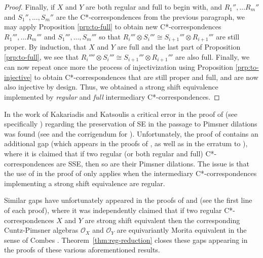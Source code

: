 \documentclass[11pt, letterpaper,final]{amsart}
\theoremstyle{definition}
\begin{document}
\begin{proof}
Finally, if $X$ and $Y$ are both regular and full to begin with, and $R_1'',...R_m''$ and $S_1'',...,S_m''$ are the C*-correspondences from the previous paragraph, we may apply Proposition \ref{prp:to-full} to obtain new C*-correspondences $R_1''',...R_m'''$ and $S_1''',...,S_m'''$ so that $R_i''' \otimes S_i''' \cong S_{i+1}''' \otimes R_{i+1}'''$ are still proper. By induction, that $X$ and $Y$ are full and the last part of Proposition \ref{prp:to-full}, we see that $R_i'''' \otimes S_i''' \cong S_{i+1}''' \otimes R_{i+1}'''$ are also full. Finally, we can now repeat once more the process of injectivization using Proposition \ref{prp:to-injective} to obtain C*-correspondences that are still proper and full, and are now also injective by design. Thus, we obtained a strong shift equivalence implemented by \emph{regular} and \emph{full} intermediary C*-correspondences.
\end{proof}

In the work of Kakariadis and Katsoulis \cite{KK-JFA2014} a critical error in the proof of \cite[Theorem 5.9]{KK-JFA2014} (see specifically \cite[Theorem 5.8]{KK-JFA2014}) regarding the preservation of SE in the passage to Pimsner dilations was found (see \cite{CDE} and the corrigendum for \cite{KK-JFA2014}). Unfortunately, the proof of \cite[Theorems 5.9]{KK-JFA2014} contains an additional gap (which appears in the proofs of \cite[Theorem 5.5 \& 7.1]{KK-JFA2014}, as well as in the erratum to \cite{KK-JFA2014}), where it is claimed that if two regular (or both regular and full) C*-correspondences are SSE, then so are their Pimsner dilations. The issue is that the use of \cite[Theorem 5.3]{KK-JFA2014} in the proof of \cite[Theorem 5.5]{KK-JFA2014} only applies when the intermediary C*-correspondences implementing a strong shift equivalence are regular. 

Similar gaps have unfortunately appeared in the proofs of \cite[Theorems~6.3 \& 6.7]{Ery22} and \cite[Theorem~3.5]{BMA} (see the first line of each proof), where it was independently claimed that if two regular C*-correspondences $X$ and $Y$ are strong shift equivalent then the corresponding Cuntz-Pimsner algebras $\mathcal{O}_X$ and $\mathcal{O}_Y$ are equivariantly Morita equivalent in the sense of Combes \cite{Combes94}. Theorem~\ref{thm:reg-reduction} closes these gaps appearing in the proofs of these various aforementioned results.
\end{document}
